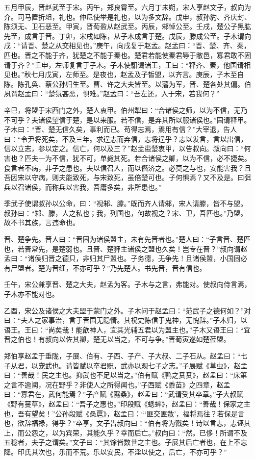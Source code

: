 \documentclass[]{article}
\begin{document}
五月甲辰，晋赵武至于宋。丙午，郑良霄至。六月丁未朔，宋人享赵文子，叔向为介。司马置折俎，礼也。仲尼使举是礼也，以为多文辞。戊申，叔孙豹、齐庆封、陈须无、卫石恶至。甲寅，晋荀盈从赵武至。丙辰，邾悼公至。壬戌，楚公子黑肱先至，成言于晋。丁卯，宋戌如陈，从子木成言于楚。戊辰，滕成公至。子木谓向戌：``请晋、楚之从交相见也。''庚午，向戌复于赵孟。赵孟曰：``晋、楚、齐、秦，匹也。晋之不能于齐，犹楚之不能于秦也。楚君若能使秦君辱于敝邑，寡君敢不固请于齐？''壬申，左师复言于子木。子木使馹谒诸王，王曰：``释齐、秦，他国请相见也。''秋七月戊寅，左师至。是夜也，赵孟及子皙盟，以齐言。庚辰，子木至自陈。陈孔奂、蔡公孙归生至。曹、许之大夫皆至。以藩为军，晋、楚各处其偏。伯夙谓赵孟曰：``楚氛甚恶，惧难。''赵孟曰：``吾左还，入于宋，若我何？''

辛巳，将盟于宋西门之外，楚人衷甲。伯州犁曰：``合诸侯之师，以为不信，无乃不可乎？夫诸侯望信于楚，是以来服。若不信，是弃其所以服诸侯也。''固请释甲。子木曰：``晋、楚无信久矣，事利而已。苟得志焉，焉用有信？''大宰退，告人曰：``令尹将死矣，不及三年。求逞志而弃信，志将逞乎？志以发言，言以出信，信以立志，参以定之。信亡，何以及三？''赵孟患楚衷甲，以告叔向。叔向曰：``何害也？匹夫一为不信，犹不可，单毙其死。若合诸侯之卿，以为不信，必不捷矣。食言者不病，非子之患也。夫以信召人，而以僭济之。必莫之与也，安能害我？且吾因宋以守病，则夫能致死，与宋致死，虽倍楚可也。子何惧焉？又不及是。曰弭兵以召诸侯，而称兵以害我，吾庸多矣，非所患也。''

季武子使谓叔孙以公命，曰：``视邾、滕。''既而齐人请邾，宋人请滕，皆不与盟。叔孙曰：``邾、滕，人之私也；我，列国也，何故视之？宋、卫，吾匹也。''乃盟。故不书其族，言违命也。

晋、楚争先。晋人曰：``晋固为诸侯盟主，未有先晋者也。''楚人曰：``子言晋、楚匹也，若晋常先，是楚弱也。且晋、楚狎主诸侯之盟也久矣！岂专在晋？''叔向谓赵孟曰：``诸侯归晋之德只，非归其尸盟也。子务德，无争先！且诸侯盟，小国固必有尸盟者。楚为晋细，不亦可乎？''乃先楚人。书先晋，晋有信也。

壬午，宋公兼享晋、楚之大夫，赵孟为客。子木与之言，弗能对。使叔向侍言焉，子木亦不能对也。

乙酉，宋公及诸侯之大夫盟于蒙门之外。子木问于赵孟曰：``范武子之德何如？''对曰：``夫人之家事治，言于晋国无隐情。其祝史陈信于鬼神，无愧辞。''子木归，以语王。王曰：``尚矣哉！能歆神人，宜其光辅五君以为盟主也。''子木又语王曰：``宜晋之伯也！有叔向以佐其卿，楚无以当之，不可与争。''晋荀寅遂如楚莅盟。

郑伯享赵孟于垂陇，子展、伯有、子西、子产、子大叔、二子石从。赵孟曰：``七子从君，以宠武也。请皆赋以卒君贶，武亦以观七子之志。''子展赋《草虫》，赵孟曰：``善哉！民之主也。抑武也不足以当之。''伯有赋《鹑之贲贲》，赵孟曰：``床第之言不逾阈，况在野乎？非使人之所得闻也。''子西赋《黍苗》之四章，赵孟曰：``寡君在，武何能焉？''子产赋《隰桑》，赵孟曰：``武请受其卒章。''子大叔赋《野有蔓草》，赵孟曰：``吾子之惠也。''印段赋《蟋蟀》，赵孟曰：``善哉！保家之主也，吾有望矣！''公孙段赋《桑扈》，赵孟曰：```匪交匪敖'，福将焉往？若保是言也，欲辞福禄，得乎？''卒享。文子告叔向曰：``伯有将为戮矣！诗以言志，志诬其上，而公怨之，以为宾荣，其能久乎？幸而后亡。''叔向曰：``然。已侈！所谓不及五稔者，夫子之谓矣。''文子曰：``其馀皆数世之主也。子展其后亡者也，在上不忘降。印氏其次也，乐而不荒。乐以安民，不淫以使之，后亡，不亦可乎？''
\end{document}
